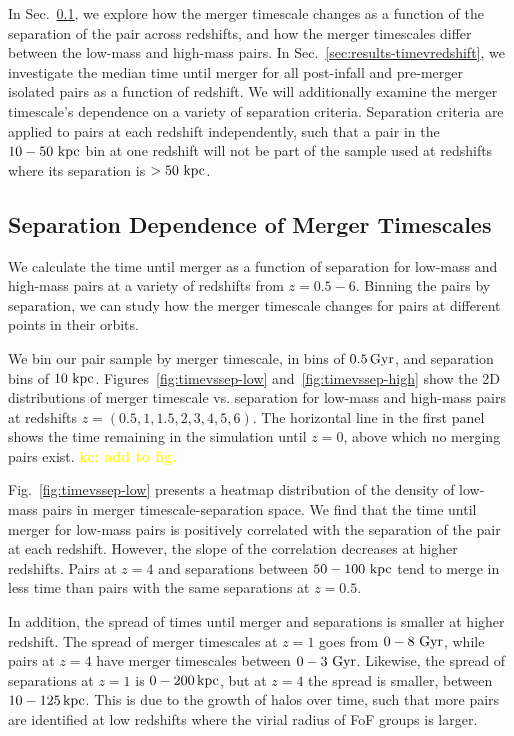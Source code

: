 \documentclass[twocolumn,linenumbers]{aastex631}
\newcommand{\kc}[1]{\textcolor{yellow}{\textbf{kc: #1}} }
\begin{document}
    In Sec.~\ref{sec:results-timevsep}, we explore how the merger timescale changes as a function of the separation of the pair across redshifts, and how the merger timescales differ between the low-mass and high-mass pairs. 
    In Sec.~\ref{sec:results-timevredshift}, we investigate the median time until merger for all post-infall and pre-merger isolated pairs as a function of redshift. 
    We will additionally examine the merger timescale's dependence on a variety of separation criteria. 
    Separation criteria are applied to pairs at each redshift independently, such that a pair in the $10-50\,\mathrm{\,kpc}$ bin at one redshift will not be part of the sample used at redshifts where its separation is $>50\,\mathrm{\,kpc}$.




\subsection{Separation Dependence of Merger Timescales}\label{sec:results-timevsep}
    We calculate the time until merger as a function of separation for low-mass and high-mass pairs at a variety of redshifts from $z=0.5-6$. 
    Binning the pairs by separation, we can study how the merger timescale changes for pairs at different points in their orbits. 
    
    We bin our pair sample by merger timescale, in bins of $0.5\mathrm{\,Gyr}$, and separation bins of $10\,\mathrm{\,kpc}$.
    Figures~\ref{fig:timevssep-low} and~\ref{fig:timevssep-high} show the 2D distributions of merger timescale vs. separation for low-mass and high-mass pairs at redshifts $z=(0.5,1,1.5,2,3,4,5,6)$. 
    The horizontal line in the first panel shows the time remaining in the simulation until $z=0$, above which no merging pairs exist. \kc{add to fig.}
    
    Fig.~\ref{fig:timevssep-low} presents a heatmap distribution of the density of low-mass pairs in merger timescale-separation space. 
    We find that the time until merger for low-mass pairs is positively correlated with the separation of the pair at each redshift. 
    However, the slope of the correlation decreases at higher redshifts.
    Pairs at $z=4$ and separations between $50-100\,\mathrm{\,kpc}$ tend to merge in less time than pairs with the same separations at $z=0.5$. 
    
    In addition, the spread of times until merger and separations is smaller at higher redshift. 
    The spread of merger timescales at $z=1$ goes from $0-8\,\mathrm{\,Gyr}$, while pairs at $z=4$ have merger timescales between $0-3\,\mathrm{\,Gyr}$. 
    Likewise, the spread of separations at $z=1$ is $0-200\mathrm{\,kpc}$, but at $z=4$ the spread is smaller, between $10-125\mathrm{\,kpc}$. 
    This is due to the growth of halos over time, such that more pairs are identified at low redshifts where the virial radius of FoF groups is larger. 
    
\end{document}
